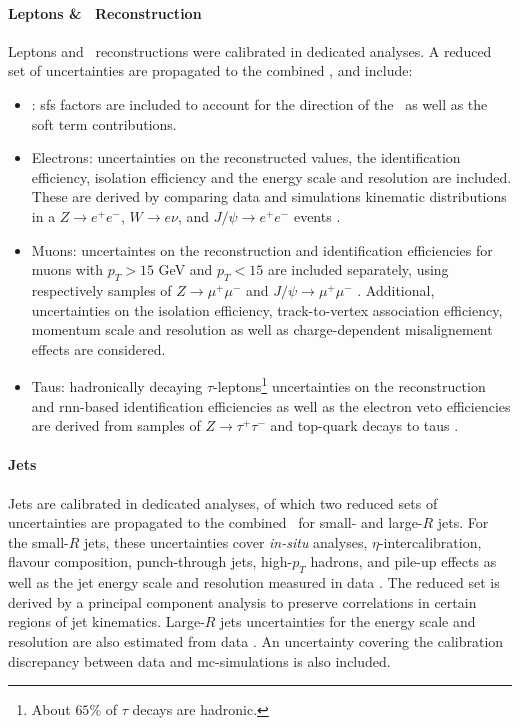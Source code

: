 \paragraph{Leptons \& \etm\ Reconstruction} Leptons and \etm\ reconstructions were calibrated in dedicated analyses. A reduced set of uncertainties are propagated to the combined \vhbc, and include:
\begin{itemize}
    \item \etm: \gls{sf}s factors are included to account for the direction of the \etm\ as well as the soft term contributions. %
    \item Electrons: uncertainties on the reconstructed values, the identification efficiency, isolation efficiency and the energy scale and resolution are included. These are derived by comparing data and simulations kinematic distributions in a $Z \rightarrow e^+ e^-$, $W\rightarrow e\nu$, and $J/\psi \rightarrow e^+e^-$ events \Cite{Aaboud:2657964}. 
    \item Muons: uncertaintes on the reconstruction and identification efficiencies for muons with $p_T > 15$ GeV and $p_T < 15$ are included separately, using respectively samples of $Z\rightarrow \mu^+\mu^-$ and $J/\psi \rightarrow \mu^+\mu^-$ \cite{Aad:2746302}. Additional, uncertainties on the isolation efficiency, track-to-vertex association efficiency, momentum scale and resolution as well as charge-dependent misalignement effects are considered. 
    \item Taus: hadronically decaying $\tau$-leptons\footnote{About $65$\% of $\tau$ decays are hadronic.} uncertainties on the reconstruction and \gls{rnn}-based identification efficiencies as well as the electron veto efficiencies are derived from samples of $Z\rightarrow\tau^+ \tau^-$ and top-quark decays to taus \cite{ATL-PHYS-PUB-2019-033, ATL-PHYS-PUB-2015-045, ATLAS-CONF-2017-029}.
\end{itemize}

\paragraph{Jets} Jets are calibrated in dedicated analyses, of which two reduced sets of uncertainties are propagated to the combined \vhbc\ for small- and large-$R$ jets. For the small-$R$ jets, these uncertainties cover \textit{in-situ} analyses, $\eta$-intercalibration, flavour composition, punch-through jets, high-$p_T$ hadrons, and pile-up effects as well as the jet energy scale and resolution measured in data \cite{ATLASjesjerMeas, Aad:2854733}. The reduced set is derived by a principal component analysis to preserve correlations in certain regions of jet kinematics. Large-$R$ jets uncertainties for the energy scale and resolution are also estimated from data \cite{ATLAS:2018bip}. An uncertainty covering the calibration discrepancy between data and \gls{mc}-simulations is also included.

